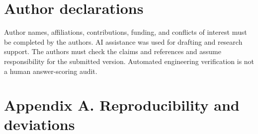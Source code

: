 \documentclass[11pt,a4paper]{article}
\begin{document}
\section*{Author declarations}\label{sec:author-declarations}
Author names, affiliations, contributions, funding, and conflicts of interest must be completed by the authors. AI assistance was used for drafting and research support. The authors must check the claims and references and assume responsibility for the submitted version. Automated engineering verification is not a human answer-scoring audit.

\section*{Appendix A. Reproducibility and deviations}\label{sec:appendix-a-reproducibility-and-deviations}
\end{document}
